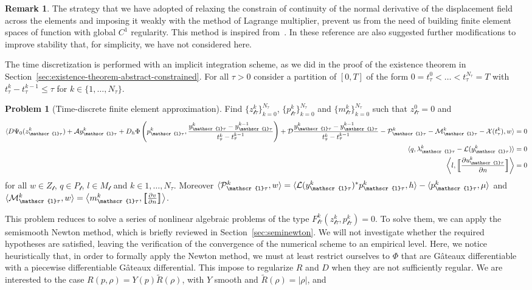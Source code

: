 \documentclass[a4paper,10pt,twoside]{amsbook}
\numberwithin{section}{chapter}
\numberwithin{equation}{chapter}
\theoremstyle{definition}
\newtheorem{rmk}[prop]{Remark}
\newtheorem{prb}[prop]{Problem}
\DeclarePairedDelimiter{\dual}{\langle}{\rangle}
\newcommand{\dind}[2]{\frac{\partial #1}{\partial #2}}
\begin{document}
\begin{rmk}
The strategy that we have adopted of relaxing the constrain of continuity of the normal derivative of the displacement field across the elements and imposing it weakly with the method of Lagrange multiplier, prevent us from the need of building finite element spaces of function with global $C^1$ regularity. This method is inspired from~\cite{kim2009numerical,engel2002continuous}. In these reference are also suggested further modifications to improve stability that, for simplicity, we have not considered here.
\end{rmk}
The time discretization is performed with an implicit integration scheme, as we did in the proof of the existence theorem in Section~\ref{sec:existence-theorem-abstract-constrained}. For all $\tau>0$ consider a partition of $[0,T]$ of the form $0=t^0_\tau<\dots<t^{N_\tau}_\tau=T$ with $t_\tau^k-t_\tau^{k-1}\le\tau$ for $k\in\{1,\dots,N_\tau\}$.
\begin{prb}[Time-discrete finite element approximation]
Find $\{z_{\mathscr{l}\tau}^k\}_{k=0}^{N_\tau}$, $\{p_{\mathscr{l}\tau}^k\}_{k=0}^{N_\tau}$ and $\{m_{\mathscr{l}\tau}^k\}_{k=0}^{N_\tau}$ such that $z_{\mathscr{l}\tau}^0=0$ and
\begin{align}
\dual{D\Psi_0(z_{\mathscr{l}\tau}^k)+\mathcal{A}y_{\mathscr{l}\tau}^k+D_h\Phi\left(p_{\mathscr{l}\tau}^k,\frac{y_{\mathscr{l}\tau}^k-y_{\mathscr{l}\tau}^{k-1}}{t_\tau^k-t_\tau^{k-1}}\right)+\mathcal{D}\frac{y_{\mathscr{l}\tau}^k-y_{\mathscr{l}\tau}^{k-1}}{t_\tau^k-t_\tau^{k-1}}-\mathcal{P}_{\mathscr{l}\tau}^k-\mathcal{M}_{\mathscr{l}\tau}^k-\mathcal{X}(t_\tau^k),w}&=0 \\
\dual{q,\lambda_{\mathscr{l}\tau}^k-\mathcal{L}(y_{\mathscr{l}\tau}^k)}&=0 \\
\left\langle l,\Big[\!\!\Big[\dind{u_{\mathscr{l}\tau}^k}{n}\Big]\!\!\Big]\right\rangle&=0
\end{align}
for all $w\in Z_\mathscr{l}$, $q\in P_\mathscr{l}$, $l\in M_\mathscr{l}$ and $k\in{1,\dots,N_\tau}$. Moreover $\dual{\mathcal{P}_{\mathscr{l}\tau}^k,w}=\dual{\mathcal{L}(y_{\mathscr{l}\tau}^k)^*p_{\mathscr{l}\tau}^k,h}-\dual{p_{\mathscr{l}\tau}^k,\mu}$ and $\dual{\mathcal{M}_{\mathscr{l}\tau}^k,w}=\left\langle m_{\mathscr{l}\tau}^k,\big[\!\!\big[\dind{v}{n}\big]\!\!\big]\right\rangle$.
\end{prb}
This problem reduces to solve a series of nonlinear algebraic problems of the type $F_{\mathscr{l}\tau}^k(z_{\mathscr{l}\tau}^k,p_{\mathscr{l}\tau}^k)=0$. To solve them, we can apply the semismooth Newton method, which is briefly reviewed in Section~\ref{sec:seminewton}. We will not investigate whether the required hypotheses are satisfied, leaving the verification of the convergence of the numerical scheme to an empirical level. Here, we notice heuristically that, in order to formally apply the Newton method, we must at least restrict ourselves to $\Phi$ that are G\^ateaux differentiable with a piecewise differentiable G\^ateaux differential. This impose to regularize $R$ and $D$ when they are not sufficiently regular. We are interested to the case $R(p,\rho)=Y(p)\tilde R(\rho)$, with $Y$ smooth and $\tilde R(\rho)=|\rho|$, and
\end{document}
